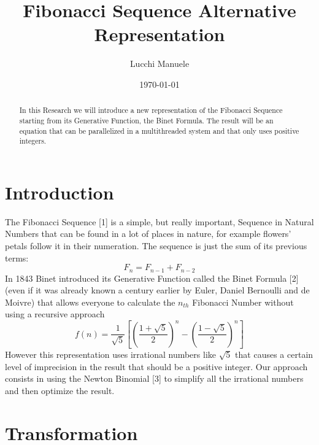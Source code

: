 \documentclass[amsmath,amssymb,aps,pra,reprint,groupedaddress,showpacs]{revtex4-1}
\begin{document}
 

\title{Fibonacci Sequence Alternative Representation}
 
\author{Lucchi Manuele}

\date{\today}

\begin{abstract}
In this Research we will introduce a new representation of the Fibonacci Sequence starting from its Generative Function, the Binet Formula. 
The result will be an equation that can be parallelized in a multithreaded system and that only uses positive integers.
\end{abstract}

\maketitle

\section{Introduction}
The Fibonacci Sequence [1] is a simple, but really important, Sequence in Natural Numbers that can be found in a lot of places in nature, 
for example flowers' petals follow it in their numeration. The sequence is just the sum of its previous terms: 
$$ F_{n} = F_{n-1} + F_{n-2} $$
In 1843 Binet introduced its Generative Function called the Binet Formula [2] (even if it was already known a century earlier by Euler, Daniel Bernoulli and de Moivre) that allows everyone to
calculate the $n_{th}$ Fibonacci Number without using a recursive approach
$$f(n) = \frac{1}{\sqrt{5}} \left[ \left( \frac{1+\sqrt{5}}{2} \right) ^n - \left( \frac{1-\sqrt{5}}{2} \right)^n \right] $$
However this representation uses irrational numbers like $\sqrt{5}$ that causes a certain level of imprecision in the result that should be a positive integer.
Our approach consists in using the Newton Binomial [3] to simplify all the irrational numbers and then optimize the result.

\section{Transformation}
\end{document}
